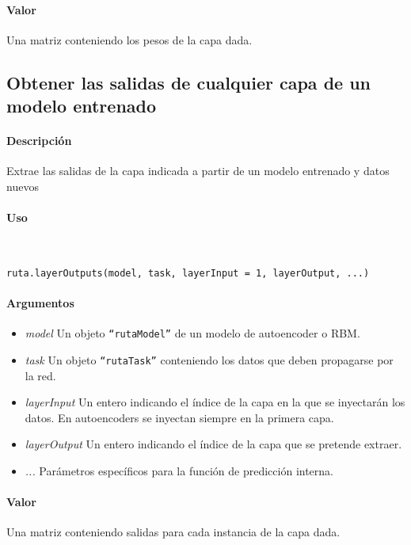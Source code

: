 \paragraph{Valor}
Una matriz conteniendo los pesos de la capa dada.


\subsection{Obtener las salidas de cualquier capa de un modelo entrenado}

\paragraph{Descripción}
Extrae las salidas de la capa indicada a partir de un modelo entrenado y datos nuevos

\paragraph{Uso}
~

\begin{lstlisting}
ruta.layerOutputs(model, task, layerInput = 1, layerOutput, ...)
\end{lstlisting}

\paragraph{Argumentos}
\begin{itemize}
\item \emph{model}	Un objeto \texttt{``rutaModel''} de un modelo de autoencoder o RBM.
\item \emph{task}	Un objeto \texttt{``rutaTask''} conteniendo los datos que deben propagarse por la red.
\item \emph{layerInput}	Un entero indicando el índice de la capa en la que se inyectarán los datos. En autoencoders se inyectan siempre en la primera capa.
\item \emph{layerOutput}	Un entero indicando el índice de la capa que se pretende extraer.
  \item \emph{...} Parámetros específicos para la función de predicción interna.
\end{itemize}

\paragraph{Valor}
Una matriz conteniendo salidas para cada instancia de la capa dada.


